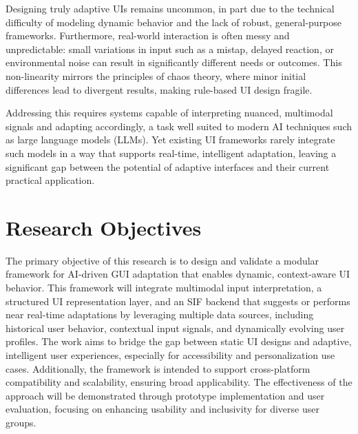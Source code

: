 \documentclass[openany]{book}
\begin{document}
Designing truly adaptive UIs remains uncommon, in part due to the technical difficulty of modeling dynamic behavior and the lack of robust, general-purpose frameworks. Furthermore, real-world interaction is often messy and unpredictable: small variations in input such as a mistap, delayed reaction, or environmental noise can result in significantly different needs or outcomes. This non-linearity mirrors the principles of chaos theory, where minor initial differences lead to divergent results, making rule-based UI design fragile.

Addressing this requires systems capable of interpreting nuanced, multimodal signals and adapting accordingly, a task well suited to modern AI techniques such as large language models (LLMs). Yet existing UI frameworks rarely integrate such models in a way that supports real-time, intelligent adaptation, leaving a significant gap between the potential of adaptive interfaces and their current practical application.

\newpage

\section{Research Objectives}

The primary objective of this research is to design and validate a modular framework for AI-driven GUI adaptation that enables dynamic, context-aware UI behavior. This framework will integrate multimodal input interpretation, a structured UI representation layer, and an SIF backend that suggests or performs near real-time adaptations by leveraging multiple data sources, including historical user behavior, contextual input signals, and dynamically evolving user profiles. The work aims to bridge the gap between static UI designs and adaptive, intelligent user experiences, especially for accessibility and personalization use cases. Additionally, the framework is intended to support cross-platform compatibility and scalability, ensuring broad applicability. The effectiveness of the approach will be demonstrated through prototype implementation and user evaluation, focusing on enhancing usability and inclusivity for diverse user groups.
\end{document}
